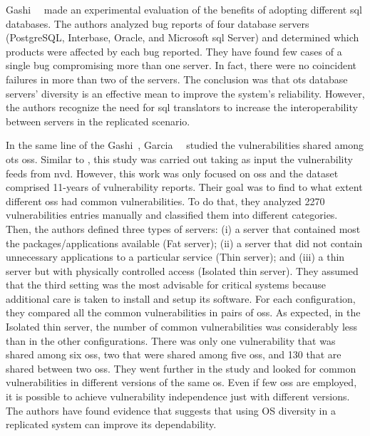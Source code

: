 Gashi~\etal{}~\cite{Gashi:2007} made an experimental evaluation of the benefits of adopting different \gls{sql} databases.
The authors analyzed bug reports of four database servers (PostgreSQL, Interbase, Oracle, and Microsoft \gls{sql} Server) and determined which products were affected by each bug reported. 
They have found few cases of a single bug compromising more than one server. 
In fact, there were no coincident failures in more than two of the servers.
The conclusion was that \gls{ots} database servers’ diversity is an effective mean to improve the system's reliability. 
However, the authors recognize the need for \gls{sql} translators to increase the interoperability between servers in the replicated scenario.

In the same line of the Gashi~\etal{}, Garcia~\etal{}~\cite{Garcia:2012} studied the vulnerabilities shared among \gls{ots} \glspl{os}.
Similar to \cite{Han:2009}, this study was carried out taking as input the vulnerability feeds from \gls{nvd}. 
However, this work was only focused on \glspl{os} and the dataset comprised 11-years of vulnerability reports. 
Their goal was to find to what extent different \glspl{os} had common vulnerabilities. 
To do that, they analyzed 2270 vulnerabilities entries manually and classified them into different categories. 
Then, the authors defined three types of servers: (i) a server that contained most the packages/applications available (Fat server); (ii) a server that did not contain unnecessary applications to a particular service (Thin server); and (iii) a thin server but with physically controlled access (Isolated thin server). 
They assumed that the third setting was the most advisable for critical systems because additional care is taken to install and setup its software. 
For each configuration, they compared all the common vulnerabilities in pairs of \glspl{os}. 
As expected, in the Isolated thin server, the number of common vulnerabilities was considerably less than in the other configurations. 
There was only one vulnerability that was shared among six \glspl{os}, two that were shared among five \glspl{os}, and 130 that are shared between two \glspl{os}. 
They went further in the study and looked for common vulnerabilities in different versions of the same \gls{os}. 
Even if few \glspl{os} are employed, it is possible to achieve vulnerability independence just with different versions.
The authors have found evidence that suggests that using OS diversity in a replicated system can improve its dependability. 



